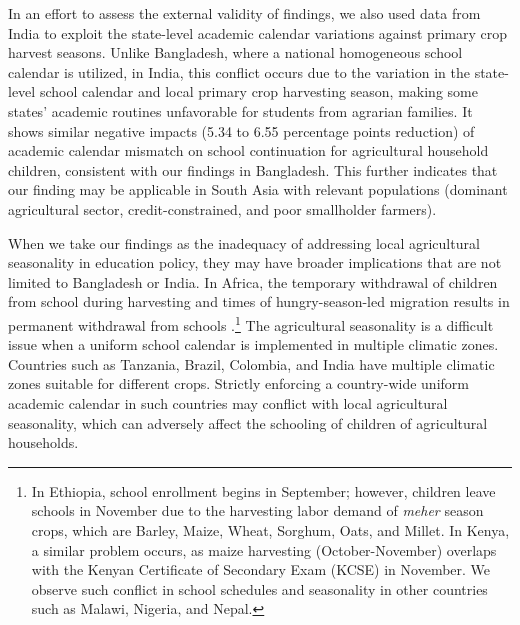\documentclass[12pt,letterpaper]{article}
\newcommand{\0}{\ensuremath{\mbox{\boldmath $0$}}}
\begin{document}
In an effort to assess the external validity of findings, we also used data from India to exploit the state-level academic calendar variations against primary crop harvest seasons. Unlike Bangladesh, where a national homogeneous school calendar is utilized, in India, this conflict occurs due to the variation in the state-level school calendar and local primary crop harvesting season, making some states' academic routines unfavorable for students from agrarian families. It shows similar negative impacts (5.34 to 6.55 percentage points reduction) of academic calendar mismatch on school continuation for agricultural household children, consistent with our findings in Bangladesh. This further indicates that our finding may be applicable in South Asia with relevant populations (dominant agricultural sector, credit-constrained, and poor smallholder farmers). 

When we take our findings as the inadequacy of addressing local agricultural seasonality in education policy, they may have broader implications that are not limited to Bangladesh or India. In Africa, the temporary withdrawal of children from school during harvesting and times of hungry-season-led migration results in permanent withdrawal from schools \citep{ andvig1999child, Colclough2000, Hadley2010, kadzamira2003can, WorldBank1998}.\footnote{In Ethiopia, school enrollment begins in September; however, children leave schools in November due to the harvesting labor demand of \textit{meher} season crops, which are Barley, Maize, Wheat, Sorghum, Oats, and Millet. In Kenya, a similar problem occurs, as maize harvesting (October-November) overlaps with the Kenyan Certificate of Secondary Exam (KCSE) in November. We observe such conflict in school schedules and seasonality in other countries such as Malawi, Nigeria, and Nepal. } The agricultural seasonality is a difficult issue when a uniform school calendar is implemented in multiple climatic zones. Countries such as Tanzania, Brazil, Colombia, and India have multiple climatic zones suitable for different crops. Strictly enforcing a country-wide uniform academic calendar in such countries may conflict with local agricultural seasonality, which can adversely affect the schooling of children of agricultural households. 
\end{document}
